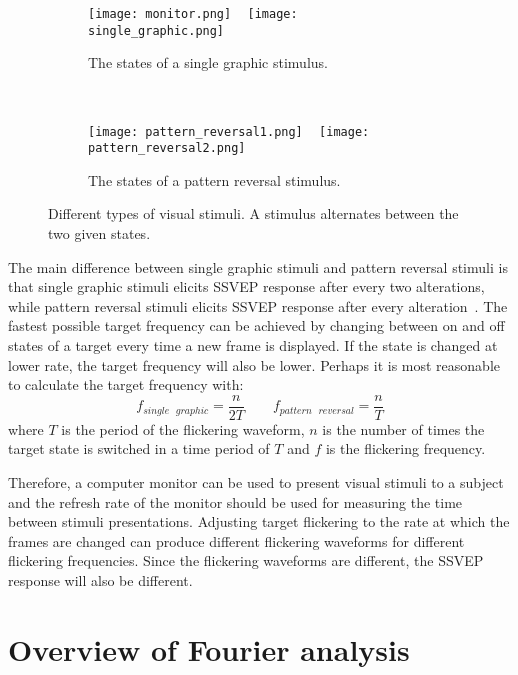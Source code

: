 \begin{figure}[h!]
	\centering
	\begin{subfigure}{0.48\textwidth}
		\texttt{[image: monitor.png]}
		~
		\texttt{[image: single\_graphic.png]}
		\caption{The states of a single graphic stimulus.}
	\end{subfigure}
	~
	\begin{subfigure}{0.48\textwidth}
		\texttt{[image: pattern\_reversal1.png]}
		~
		\texttt{[image: pattern\_reversal2.png]}
		\caption{The states of a pattern reversal stimulus.}
	\end{subfigure}
	\caption{Different types of visual stimuli. A stimulus alternates between the two given states.}
	\label{fig:stimuli}
\end{figure}

The main difference between \gls{single graphic} stimuli and \gls{pattern reversal} stimuli is that \gls{single graphic} stimuli elicits \gls{SSVEP} response after every two alterations, while \gls{pattern reversal} stimuli elicits \gls{SSVEP} response after every alteration~\cite{ssvep_stim}. The fastest possible target frequency can be achieved by changing between on and off \glspl{state} of a target every time a new \gls{frame} is displayed. If the \gls{state} is changed at lower rate, the \gls{target} frequency will also be lower. Perhaps it is most reasonable to calculate the \gls{target} frequency with:
\begin{equation}
	f_{single\mbox{ }graphic} = \frac{n}{2T} \qquad f_{pattern\mbox{ }reversal} = \frac{n}{T}
\end{equation}
where $T$ is the period of the \gls{flickering waveform}, $n$ is the number of times the \gls{target} \gls{state} is switched in a time period of $T$ and $f$ is the \gls{flickering} frequency.

Therefore, a computer monitor can be used to present visual stimuli to a subject and the \gls{refresh rate} of the monitor should be used for measuring the time between stimuli presentations. Adjusting \gls{target} \gls{flickering} to the rate at which the \glspl{frame} are changed can produce different \glspl{flickering waveform} for different \gls{flickering} frequencies. Since the \glspl{flickering waveform} are different, the \gls{SSVEP} response will also be different.

\section{Overview of Fourier analysis}
\label{sec:fourier}

